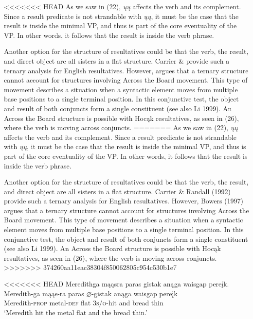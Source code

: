 \documentclass[output=paper]{LSP/langsci}
\begin{document}
\begin{exe}
\begin{exe}
\begin{exe}
\begin{exe}
{\begin{exe}
\begin{exe}
\end{exe}

<<<<<<< HEAD
As we saw in (22), \textit{ųų} affects the verb and its complement. Since a result predicate is not strandable with \textit{ųų}, it must be the case that the result is inside the minimal VP, and thus is part of the core eventuality of the VP. In other words, it follows that the result is inside the verb phrase.

Another option for the structure of resultatives could be that the verb, the result, and direct object are all sisters in a flat structure. Carrier \& \citet{Randall1992} provide such a ternary analysis for English resultatives. However, \citet{Bowers1997} argues that a ternary structure cannot account for structures involving Across the Board movement. This type of movement describes a situation when a syntactic element moves from multiple base positions to a single terminal position. In this conjunctive test, the object and result of both conjuncts form a single constituent (see also Li 1999). An Across the Board structure is possible with Hocąk resultatives, as seen in (26), where the verb is moving across conjuncts.
=======
As we saw in (22), \textit{\k{u}\k{u}} affects the verb and its complement. Since a result predicate is not strandable with \textit{\k{u}\k{u}}, it must be the case that the result is inside the minimal VP, and thus is part of the core eventuality of the VP. In other words, it follows that the result is inside the verb phrase.

Another option for the structure of resultatives could be that the verb, the result, and direct object are all sisters in a flat structure. Carrier \& Randall (1992) provide such a ternary analysis for English resultatives. However, Bowers (1997) argues that a ternary structure cannot account for structures involving Across the Board movement. This type of movement describes a situation when a syntactic element moves from multiple base positions to a single terminal position. In this conjunctive test, the object and result of both conjuncts form a single constituent (see also Li 1999). An Across the Board structure is possible with Hoc\k{a}k resultatives, as seen in (26), where the verb is moving across conjuncts.
>>>>>>> 374260aa11eac38304f850062805c954c530b1e7

\begin{exe}
\ex
\begin{xlist}

<<<<<<< HEAD
\ex \glll Meredithga mąąsra paras gistak anąga waisgap pereįk. \\
Meredith-ga mąąs-ra paras {$\varnothing$}-gistak anąga waisgap pereįk\\
Meredith-\textsc{prop} metal-\textsc{def} flat \textsc{3s/o}-hit and bread thin\\
\glt `Meredith hit the metal flat and the bread thin.'


\end{xlist}
\end{exe}
\end{exe}}
\end{exe}
\end{exe}
\end{exe}
\end{exe}
\end{document}
